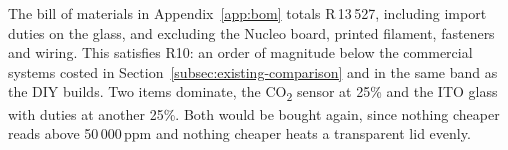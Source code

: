 The bill of materials in Appendix~\ref{app:bom} totals R\,13\,527, including import duties on the glass, and excluding the Nucleo board, printed filament, fasteners and wiring. This satisfies R10: an order of magnitude below the commercial systems costed in Section~\ref{subsec:existing-comparison} and in the same band as the DIY builds. Two items dominate, the CO\textsubscript{2} sensor at 25\% and the ITO glass with duties at another 25\%. Both would be bought again, since nothing cheaper reads above 50\,000\,ppm and nothing cheaper heats a transparent lid evenly.

